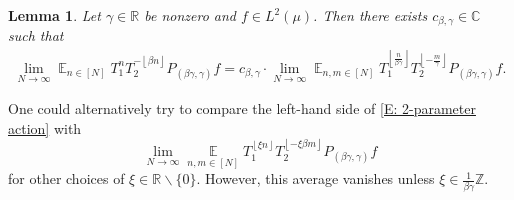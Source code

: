 \documentclass[11pt]{amsart}
\newtheorem{lemma}{Lemma}[section]
\theoremstyle{definition}
\DeclareMathOperator*{\E}{\mathbb{E}}
\newcommand{\C}{{\mathbb C}}
\newcommand{\R}{{\mathbb R}}
\newcommand{\Z}{{\mathbb Z}}
\newcommand{\1}{{\mathbf{1}}}
\newcommand{\brac}[1]{\mathopen{}\left( #1 \mathclose{}\right)}
\newcommand{\floor}[1]{{\left \lfloor #1 \right \rfloor}}
\newcommand{\rem}[1]{\left \{ #1 \right \}}
\begin{document}
\begin{lemma}\label{L: scaling}
Let $\gamma\in\R$ be nonzero and $f\in L^2(\mu)$. Then there exists $c_{\beta, \gamma}\in\C$ such that  %
\begin{align}\label{E: 2-parameter action}
\lim_{N\to\infty}\E_{n\in[N]} T_1^n T_2^{-\floor{\beta n}} P_{(\beta \gamma, \gamma)} f = c_{\beta, \gamma} \cdot \lim_{N\to\infty}\E_{n, m\in[N]} T_1^{\floor{\frac{n}{\beta \gamma}}} T_2^{\floor{-\frac{m}{\gamma}}} P_{(\beta \gamma, \gamma)} f.
\end{align}
\end{lemma}

One could alternatively try to compare the left-hand side of \eqref{E: 2-parameter action} with $$\lim\limits_{N\to\infty}\E\limits_{n, m\in[N]} T_1^{\floor{\xi n}} T_2^{\floor{-\xi \beta m}} P_{(\beta \gamma, \gamma)} f$$ for other choices of $\xi\in\R\backslash\{0\}$. However, 
this average vanishes unless $\xi\in\frac{1}{\beta\gamma}\Z$.

\end{document}
